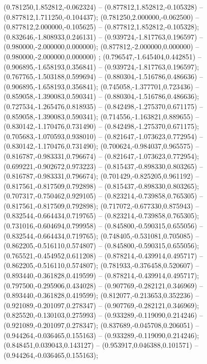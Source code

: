  (0.781250,1.852812,-0.062324) -- (0.877812,1.852812,-0.105328) -- (0.877812,1.711250,-0.104437);
 (0.781250,2.000000,-0.062500) -- (0.877812,2.000000,-0.105625) -- (0.877812,1.852812,-0.105328);
 (0.832646,-1.808933,0.246131) -- (0.939724,-1.817763,0.196597) -- (0.980000,-2.000000,0.000000);
 (0.877812,-2.000000,0.000000) -- (0.980000,-2.000000,0.000000) ;
 (0.796547,-1.645404,0.442851) -- (0.906895,-1.658193,0.356841) -- (0.939724,-1.817763,0.196597);
 (0.767765,-1.503188,0.599694) -- (0.880304,-1.516786,0.486636) -- (0.906895,-1.658193,0.356841);
 (0.745058,-1.377701,0.723436) -- (0.859058,-1.390083,0.590341) -- (0.880304,-1.516786,0.486636);
 (0.727534,-1.265476,0.818935) -- (0.842498,-1.275370,0.671175) -- (0.859058,-1.390083,0.590341);
 (0.714556,-1.163821,0.889655) -- (0.830142,-1.170476,0.731490) -- (0.842498,-1.275370,0.671175);
 (0.705683,-1.070593,0.938010) -- (0.821647,-1.073623,0.772954) -- (0.830142,-1.170476,0.731490);
 (0.700624,-0.984037,0.965575) -- (0.816787,-0.983331,0.796674) -- (0.821647,-1.073623,0.772954);
 (0.699221,-0.902672,0.973223) -- (0.815437,-0.898330,0.803265) -- (0.816787,-0.983331,0.796674);
 (0.701429,-0.825205,0.961192) -- (0.817561,-0.817509,0.792898) -- (0.815437,-0.898330,0.803265);
 (0.707317,-0.750462,0.929105) -- (0.823214,-0.739858,0.765305) -- (0.817561,-0.817509,0.792898);
 (0.717072,-0.677330,0.875943) -- (0.832544,-0.664434,0.719765) -- (0.823214,-0.739858,0.765305);
 (0.731016,-0.604694,0.799958) -- (0.845800,-0.590315,0.655056) -- (0.832544,-0.664434,0.719765);
 (0.748405,-0.531081,0.705085) -- (0.862205,-0.516110,0.574807) -- (0.845800,-0.590315,0.655056);
 (0.765521,-0.454952,0.611208) -- (0.878214,-0.439914,0.495717) -- (0.862205,-0.516110,0.574807);
 (0.781933,-0.376458,0.520607) -- (0.893440,-0.361828,0.419599) -- (0.878214,-0.439914,0.495717);
 (0.797500,-0.295906,0.434028) -- (0.907769,-0.282121,0.346969) -- (0.893440,-0.361828,0.419599);
 (0.812077,-0.213653,0.352236) -- (0.921089,-0.201097,0.278347) -- (0.907769,-0.282121,0.346969);
 (0.825520,-0.130103,0.275993) -- (0.933289,-0.119090,0.214246) -- (0.921089,-0.201097,0.278347);
 (0.837689,-0.045708,0.206051) -- (0.944264,-0.036465,0.155163) -- (0.933289,-0.119090,0.214246);
 (0.848451,0.039043,0.143127) -- (0.953917,0.046388,0.101571) -- (0.944264,-0.036465,0.155163);
